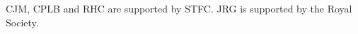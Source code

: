 \documentclass[prb,preprint]{revtex4-1}
\begin{document}
\begin{acknowledgments}
CJM, CPLB and RHC are supported by STFC. JRG is supported by the Royal Society.
\end{acknowledgments}


\begin{thebibliography}{5}

\end{thebibliography}






\end{document}
